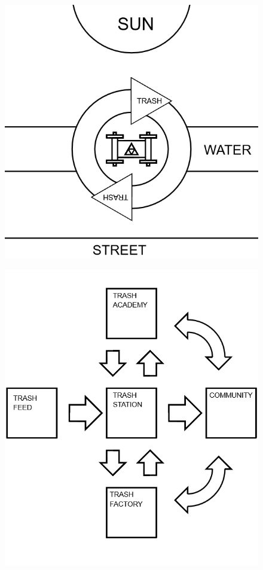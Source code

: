 \documentclass[17pt]{extreport}
\begin{document}
	\begin{figure}
		\centering
		\includegraphics[width=6.25in]{imageserver/uploadimages/image14.png}
	\end{figure}
	
	\begin{figure}
		\centering
		\includegraphics[width=6.25in]{imageserver/uploadimages/trashgraph.png}
	\end{figure}
	
\end{document}
